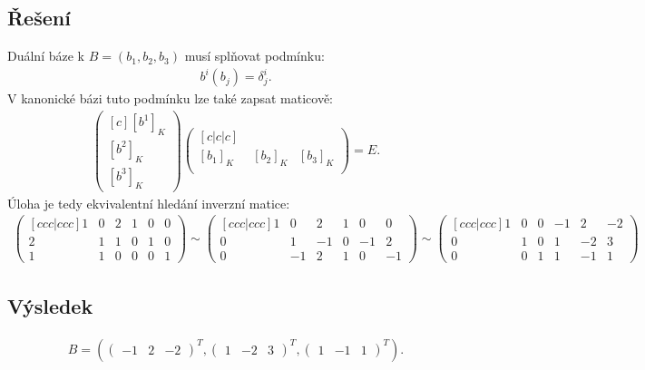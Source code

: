 \documentclass[]{article}
\begin{document}
\subsection{Řešení}
Duální báze k $B = (b_1, b_2, b_3)$ musí splňovat podmínku:
\begin{align*}
    b^i(b_j) = \delta^i_j.
\end{align*}
\medskip
V kanonické bázi tuto podmínku lze také zapsat maticově:
\begin{align*}
    \begin{pmatrix}[c]
        [b^1]_K \\ \hline
        [b^2]_K \\ \hline
        [b^3]_K
    \end{pmatrix}
    \begin{pmatrix}[c|c|c]
        \; & \; & \;
        \\
        [b_1]_K &
        [b_2]_K &
        [b_3]_K
        \\
        \; & \; & \;
    \end{pmatrix}
    = E.
\end{align*}
\medskip
Úloha je tedy ekvivalentní hledání inverzní matice:
\begin{align*}
    \begin{pmatrix}[ccc|ccc]
        1 & 0 & 2  &  1 & 0 & 0 \\
        2 & 1 & 1  &  0 & 1 & 0 \\
        1 & 1 & 0  &  0 & 0 & 1
    \end{pmatrix}
    \sim
    \begin{pmatrix}[ccc|ccc]
        1 & 0 & 2  &  1 & 0 & 0 \\
        0 & 1 &-1  &  0 &-1 & 2 \\
        0 &-1 & 2  &  1 & 0 &-1
    \end{pmatrix}
    \sim
    \begin{pmatrix}[ccc|ccc]
        1 & 0 & 0  & -1 & 2 &-2 \\
        0 & 1 & 0  &  1 &-2 & 3 \\
        0 & 0 & 1  &  1 &-1 & 1
    \end{pmatrix}
\end{align*}

\subsection{Výsledek}
\begin{align*}
    B = (
        \begin{pmatrix}
            -1 & 2 & -2
        \end{pmatrix}^T
        ,
        \begin{pmatrix}
            1 & -2 & 3
        \end{pmatrix}^T
        ,
        \begin{pmatrix}
            1 & -1 & 1
        \end{pmatrix}^T
    ).
\end{align*}

\endgroup
\end{document}
